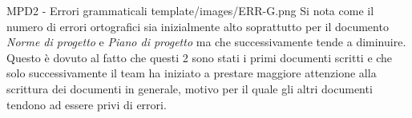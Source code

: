 \Met
{ %
    MPD2 - Errori grammaticali
}
{ %
    template/images/ERR-G.png
}
{ %
    Si nota come il numero di errori ortografici sia inizialmente alto soprattutto per il documento \textit{Norme di progetto} e 
    \textit{Piano di progetto} ma che successivamente tende a diminuire.
    Questo è dovuto al fatto che questi 2 sono stati i primi documenti scritti e che solo successivamente il team ha iniziato a prestare maggiore
    attenzione alla scrittura dei documenti in generale, motivo per il quale gli altri documenti tendono ad essere privi di errori.
}



